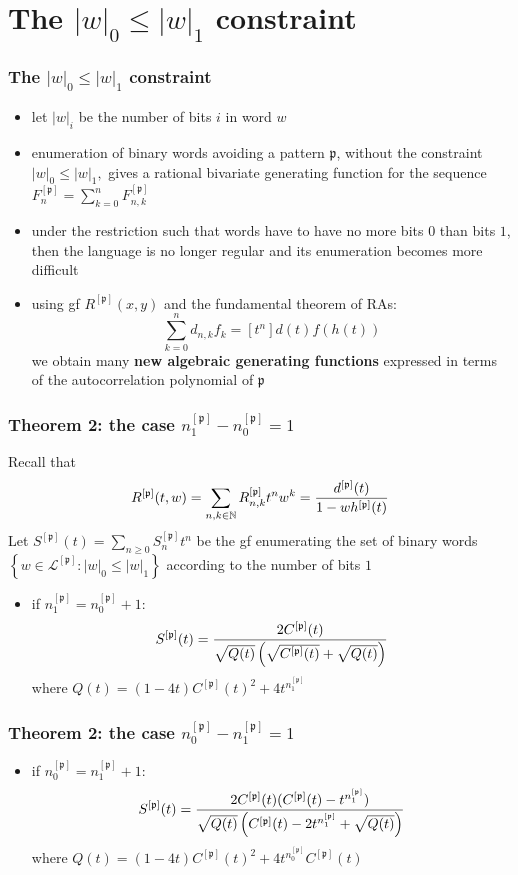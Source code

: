 \documentclass{beamer}
\begin{document}
\section{The $|w|_{0}\leq |w|_{1}$ constraint}

\begin{frame}\frametitle{The $|w|_{0}\leq |w|_{1}$ constraint}
\begin{itemize}
\item let $|w|_{i}$ be the number of bits $i$ in word $w$
\item enumeration of binary words avoiding a pattern $\mathfrak{p}$, without the
constraint $|w|_0\leq |w|_1,$ gives a rational bivariate generating function
for the sequence $F^{[\mathfrak{p}]}_n=\sum_{k=0}^nF_{n,k}^{[\mathfrak{p}]}$
\item under the restriction such that words have to have no more bits $0$ than
bits $1$, then the language is no longer regular and its enumeration becomes
more difficult
\item using gf $R^{[\mathfrak{p}]}(x,y)$ and the fundamental theorem of RAs:
$$\sum_{k=0}^n d_{n,k}f_k=[t^n]d(t)f(h(t)) $$ we obtain many {\bf \red new
algebraic generating functions} expressed in terms of the autocorrelation
polynomial of  $\mathfrak{p}$
\end{itemize}
\end{frame}

\begin{frame}\frametitle{Theorem 2: the case $n_1^{[\mathfrak{p}]}-n_0^{[\mathfrak{p}]}=1$}
Recall that 
\begin{displaymath}
    R^{[\mathfrak{p}]}(t,w)=\sum_{n,k\in\mathbb{N}} R_{n, k}^{[\mathfrak{p}]}t^n
    w^k={d^{[\mathfrak{p}]}(t) \over 1-wh^{[\mathfrak{p}]}(t)}
\end{displaymath}
Let $S^{[\mathfrak{p}]}(t)=\sum_{n\geq 0}S_n^{[\mathfrak{p}]}t^n$ be the gf
enumerating the set of binary words $\left\lbrace
w\in\mathcal{L}^{[\mathfrak{p}]} : |w|_0\leq |w|_1\right\rbrace$ according to
the number of bits $1$
\begin{itemize}
\item if $n_1^{[\mathfrak{p}]}=n_0^{[\mathfrak{p}]}+1:$
$$S^{[\mathfrak{p}]}(t)={2C^{[\mathfrak{p}]}(t) \over \sqrt{Q(t)}\left(\sqrt{C^{[\mathfrak{p}]}(t)}+ \sqrt{Q(t)} \right)} $$
    where $Q(t)={(1-4t)C^{[\mathfrak{p}]}(t)^2+4t^{n_1^{[\mathfrak{p}]}}}$
\end{itemize}
\end{frame}

\begin{frame}\frametitle{Theorem 2: the case $n_0^{[\mathfrak{p}]}-n_1^{[\mathfrak{p}]}=1$}
\begin{itemize}
\item if $n_0^{[\mathfrak{p}]}=n_1^{[\mathfrak{p}]}+1:$
$$S^{[\mathfrak{p}]}(t)={2C^{[\mathfrak{p}]}(t)(C^{[\mathfrak{p}]}(t)-t^{n_1^{[\mathfrak{p}]}}
) \over \sqrt{Q(t)} \left(C^{[\mathfrak{p}]}(t)-2t^{n_1^{[\mathfrak{p}]}}+ \sqrt{Q(t)} \right) }$$
    where $Q(t)={ (1-4t)C^{[\mathfrak{p}]}(t)^2+4t^{n_0^{[\mathfrak{p}]}}C^{[\mathfrak{p}]}(t)}$
\end{itemize}
\end{frame}
\end{document}
